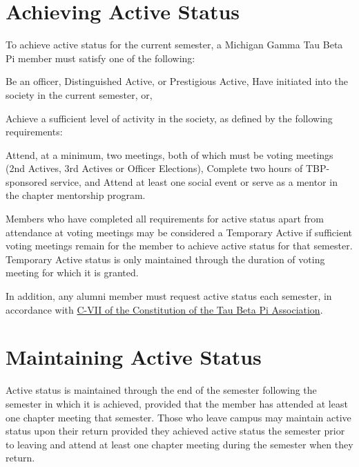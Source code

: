 \section{Achieving Active Status}
To achieve active status for the current semester, a Michigan Gamma Tau Beta Pi member must satisfy one of the following:
\begin{enumsubsection}
\itemnotoc	Be an officer, Distinguished Active, or Prestigious Active,
\itemnotoc	Have initiated into the society in the current semester, or,


\itemnotoc	Achieve a sufficient level of activity in the society, as defined by the following requirements:
\begin{enumsubsubsection}
\itemnotoc	Attend, at a minimum, two meetings, both of which must be voting meetings (2nd Actives, 3rd Actives or Officer Elections),
\itemnotoc	Complete two hours of TBP-sponsored service, and
\itemnotoc	Attend at least one social event or serve as a mentor in the chapter mentorship program.
\end{enumsubsubsection}
\end{enumsubsection}
Members who have completed all requirements for active status apart from attendance at voting meetings may be considered a Temporary Active if sufficient voting meetings remain for the member to achieve active status for that semester.
Temporary Active status is only maintained through the duration of voting meeting for which it is granted.

In addition, any alumni member must request active status each semester, in accordance with \href{http://www.tbp.org/off/ConstBylaw.pdf}{C-VII of the Constitution of the Tau Beta Pi Association}.

\section{Maintaining Active Status}
Active status is maintained through the end of the semester following the semester in which it is achieved, provided that the member has attended at least one chapter meeting that semester.
Those who leave campus may maintain active status upon their return provided they achieved active status the semester prior to leaving and attend at least one chapter meeting during the semester when they return.

